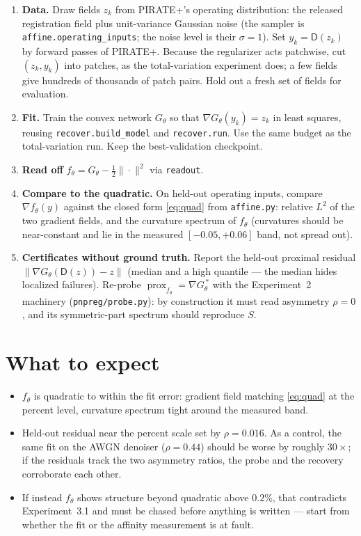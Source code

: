 \documentclass[11pt]{article}
\newcommand{\D}{\mathsf{D}}
\newcommand{\prox}{\operatorname{prox}}
\newcommand{\code}[1]{\texttt{#1}}
\begin{document}
\begin{enumerate}
\item \textbf{Data.} Draw fields $z_k$ from PIRATE+'s operating distribution: the released registration field plus unit-variance Gaussian noise (the sampler is \code{affine.operating\_inputs}; the noise level is their $\sigma = 1$). Set $y_k = \D(z_k)$ by forward passes of PIRATE+. Because the regularizer acts patchwise, cut $(z_k, y_k)$ into patches, as the total-variation experiment does; a few fields give hundreds of thousands of patch pairs. Hold out a fresh set of fields for evaluation.
\item \textbf{Fit.} Train the convex network $G_\theta$ so that $\nabla G_\theta(y_k) = z_k$ in least squares, reusing \code{recover.build\_model} and \code{recover.run}. Use the same budget as the total-variation run. Keep the best-validation checkpoint.
\item \textbf{Read off} $f_\theta = G_\theta - \tfrac12\|\cdot\|^2$ via \code{readout}.
\item \textbf{Compare to the quadratic.} On held-out operating inputs, compare $\nabla f_\theta(y)$ against the closed form \eqref{eq:quad} from \code{affine.py}: relative $L^2$ of the two gradient fields, and the curvature spectrum of $f_\theta$ (curvatures should be near-constant and lie in the measured $[-0.05, +0.06]$ band, not spread out).
\item \textbf{Certificates without ground truth.} Report the held-out proximal residual $\|\nabla G_\theta(\D(z)) - z\|$ (median and a high quantile --- the median hides localized failures). Re-probe $\prox_{f_\theta} = \nabla G_\theta^{\,*}$ with the Experiment~2 machinery (\code{pnpreg/probe.py}): by construction it must read asymmetry $\rho = 0$, and its symmetric-part spectrum should reproduce $S$.
\end{enumerate}

\section{What to expect}

\begin{itemize}
\item $f_\theta$ is quadratic to within the fit error: gradient field matching \eqref{eq:quad} at the percent level, curvature spectrum tight around the measured band.
\item Held-out residual near the percent scale set by $\rho = 0.016$. As a control, the same fit on the AWGN denoiser ($\rho = 0.44$) should be worse by roughly $30\times$; if the residuals track the two asymmetry ratios, the probe and the recovery corroborate each other.
\item If instead $f_\theta$ shows structure beyond quadratic above $0.2\%$, that contradicts Experiment~3.1 and must be chased before anything is written --- start from whether the fit or the affinity measurement is at fault.
\end{itemize}
\end{document}
